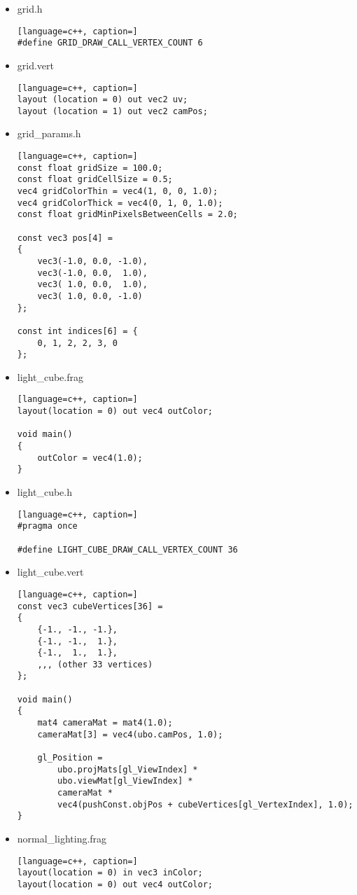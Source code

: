 \begin{itemize}
\begin{lstlisting}[language=c++, caption=]
void main()
{
    outColor = gridColor(uv, camPos);
}
\end{lstlisting}
    \item grid.h
\begin{lstlisting}[language=c++, caption=]
#define GRID_DRAW_CALL_VERTEX_COUNT 6
\end{lstlisting}
    \item grid.vert
\begin{lstlisting}[language=c++, caption=]
layout (location = 0) out vec2 uv;
layout (location = 1) out vec2 camPos;
\end{lstlisting}
    \item grid\_params.h
\begin{lstlisting}[language=c++, caption=]
const float gridSize = 100.0;
const float gridCellSize = 0.5;
vec4 gridColorThin = vec4(1, 0, 0, 1.0);
vec4 gridColorThick = vec4(0, 1, 0, 1.0);
const float gridMinPixelsBetweenCells = 2.0;

const vec3 pos[4] =
{
    vec3(-1.0, 0.0, -1.0),
    vec3(-1.0, 0.0,  1.0),
    vec3( 1.0, 0.0,  1.0),
    vec3( 1.0, 0.0, -1.0)
};

const int indices[6] = {
    0, 1, 2, 2, 3, 0
};

\end{lstlisting}
    \item light\_cube.frag
\begin{lstlisting}[language=c++, caption=]
layout(location = 0) out vec4 outColor;

void main()
{
    outColor = vec4(1.0);
}
\end{lstlisting}
    \item light\_cube.h
\begin{lstlisting}[language=c++, caption=]
#pragma once

#define LIGHT_CUBE_DRAW_CALL_VERTEX_COUNT 36
\end{lstlisting}
    \item light\_cube.vert
\begin{lstlisting}[language=c++, caption=]
const vec3 cubeVertices[36] =
{
    {-1., -1., -1.},
    {-1., -1.,  1.},
    {-1.,  1.,  1.},
    ,,, (other 33 vertices)
};

void main()
{
    mat4 cameraMat = mat4(1.0);
    cameraMat[3] = vec4(ubo.camPos, 1.0);

    gl_Position =
        ubo.projMats[gl_ViewIndex] *
        ubo.viewMat[gl_ViewIndex] *
        cameraMat *
        vec4(pushConst.objPos + cubeVertices[gl_VertexIndex], 1.0);
}
\end{lstlisting}
    \item normal\_lighting.frag
\begin{lstlisting}[language=c++, caption=]
layout(location = 0) in vec3 inColor;
layout(location = 0) out vec4 outColor;


\end{lstlisting}
\end{itemize}
